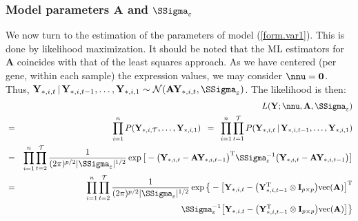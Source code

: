 \documentclass[a4paper]{article}
\theoremstyle{myexamplestyle}
\begin{document}
\subsubsection{Model parameters $\mathbf{A}$ and $\SSigma_{\varepsilon}$}
We now turn to the estimation of the parameters of model (\ref{form.var1}). This is done by likelihood maximization. It should be noted that the ML estimators for $\mathbf{A}$ coincides with that of the least squares approach. As we have centered (per gene, within each sample) the expression values, we may consider $\nnu = \mathbf{0}$. Thus, $\mathbf{Y}_{\ast,i,t} \, | \, \mathbf{Y}_{\ast,i,t-1}, \ldots,  \mathbf{Y}_{\ast,i,1}  \sim \mathcal{N}( \mathbf{A} \mathbf{Y}_{\ast,i,t}  , \SSigma_{\varepsilon})$. The likelihood is then:
\begin{eqnarray*}
& & \hspace{-1cm} L(\mathbf{Y}; \nnu, \mathbf{A}, \SSigma_{\varepsilon})
\\
& = & \prod_{i=1}^n P(\mathbf{Y}_{\ast,i,\mathcal{T}}, \ldots, \mathbf{Y}_{\ast,i,1})
\, \, \,  = \, \, \, \prod_{i=1}^n
\prod_{t=1}^{\mathcal{T}} P(\mathbf{Y}_{\ast,i,t} \, | \, \mathbf{Y}_{\ast,i,t-1}, \ldots, \mathbf{Y}_{\ast,i,1})
\\
& = & \prod_{i=1}^n \prod_{t=2}^{\mathcal{T}} \frac{1}{(2\pi)^{p/2} | \SSigma_{\varepsilon} |^{1/2} } \exp \big[ - \big( \mathbf{Y}_{\ast,i,t} - \mathbf{A} \mathbf{Y}_{\ast,i,t-1}  \big)^\mathrm{T} \SSigma_{\varepsilon}^{-1} \big(\mathbf{Y}_{\ast,i,t} - \mathbf{A} \mathbf{Y}_{\ast,i,t-1}  \big) \big]
\\
& = & \prod_{i=1}^n \prod_{t=2}^{\mathcal{T}} \frac{1}{(2\pi)^{p/2} | \SSigma_{\varepsilon} |^{1/2} }  \exp \big\{ - \big[ \mathbf{Y}_{\ast,i,t} -
\big( \mathbf{Y}_{\ast,i,t-1}^{\mathrm{T}}  \otimes \mathbf{I}_{p \times p} \big) \mbox{vec}(\mathbf{A})  \big]^{\mathrm{T}}
\\
& & \qquad \qquad \qquad \qquad  \qquad \qquad \qquad \, \SSigma_{\varepsilon}^{-1} \big[ \mathbf{Y}_{\ast,i,t} -
\big( \mathbf{Y}_{\ast,i,t-1}^\mathrm{T}  \otimes \mathbf{I}_{p \times p} \big) \mbox{vec}(\mathbf{A})  \big] \big\}
\end{eqnarray*}
\end{document}
